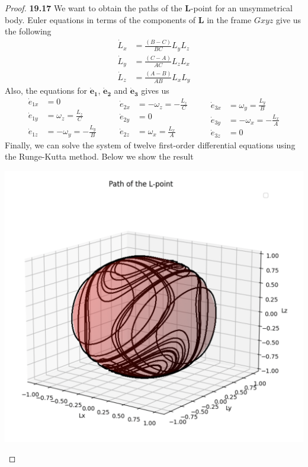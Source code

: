 \documentclass[11pt]{article}
\theoremstyle{definition}
\begin{document}
\begin{proof}{\textbf{19.17}}
    We want to obtain the paths of the $\bm L$-point for an unsymmetrical body.
    Euler equations in terms of the components of $\bm{L}$ in the frame
    $Gxyz$ give us the following 
    \begin{align*}
        \dot{L}_x &= \frac{(B - C)}{BC}L_yL_z\\
        \dot{L}_y &= \frac{(C - A)}{AC}L_zL_x\\
        \dot{L}_z &= \frac{(A - B)}{AB}L_xL_y
    \end{align*}
    Also, the equations for $\bm{\dot{e}_1}$, $\bm{\dot{e}_2}$ and
    $\bm{\dot{e}_3}$ gives us    
    \begin{equation*}
    \begin{aligned}
        \dot{e}_{1x} &= 0\\
        \dot{e}_{1y} &= \omega_z = \frac{L_z}{C}\\
        \dot{e}_{1z} &= -\omega_y = -\frac{L_y}{B}
    \end{aligned}
    \qquad
    \begin{aligned}
        \dot{e}_{2x} &= -\omega_z = -\frac{L_z}{C}\\
        \dot{e}_{2y} &=  0\\ 
        \dot{e}_{2z} &= \omega_x = \frac{L_x}{A}
    \end{aligned}
    \qquad
    \begin{aligned}
        \dot{e}_{3x} &= \omega_y = \frac{L_y}{B}\\
        \dot{e}_{3y} &= -\omega_x = -\frac{L_x}{A}\\
        \dot{e}_{3z} &= 0
    \end{aligned}
    \end{equation*}
    Finally, we can solve the system of twelve first-order differential
    equations using the Runge-Kutta method.
    Below we show the result
    \begin{center}
        \includegraphics[scale=0.4]{ch19-17.png}
    \end{center}
\end{proof}
\end{document}
